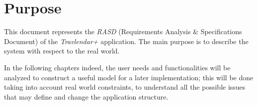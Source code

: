 \section{Purpose}
This document represents the \emph{RASD} (Requirements Analysis \& Specifications Document) of the \emph{Travlendar+} application. The main purpose is to describe the system with respect to the real world. 

In the following chapters indeed, the user needs and functionalities will be analyzed to construct a useful model for a later implementation; this will be done taking into account real world constraints, to understand all the possible issues that may define and change the application structure. 

